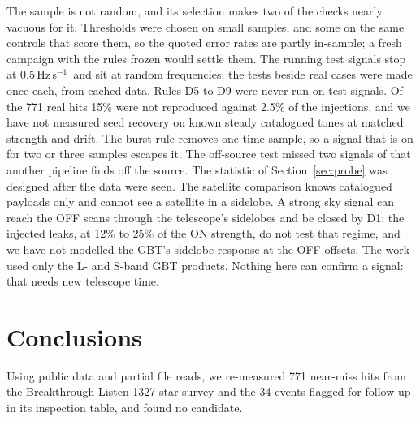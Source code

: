 \documentclass[twocolumn]{aastex631}
\newcommand{\hzs}{Hz\,s$^{-1}$}
\begin{document}
The sample is not random, and its selection makes two of the checks nearly
vacuous for it. Thresholds were chosen on small samples, and some on the
same controls that score them, so the quoted error rates are partly
in-sample; a fresh campaign with the rules frozen would settle them. The
running test signals stop at 0.5\,\hzs\ and sit at random frequencies; the
tests beside real cases were made once each, from cached data. Rules D5 to
D9 were never run on test signals. Of the 771 real hits 15\% were not
reproduced against 2.5\% of the injections, and we have not measured seed
recovery on known steady catalogued tones at matched strength and drift. The burst rule removes one time sample, so a signal that is
on for two or three samples escapes it. The off-source test
missed two signals of \citet{Ma2023} that another pipeline finds off the
source. The statistic of Section~\ref{sec:probe} was designed after the
data were seen. The satellite comparison knows catalogued payloads only and
cannot see a satellite in a sidelobe. A strong sky signal can reach the
OFF scans through the telescope's sidelobes and be closed by D1; the
injected leaks, at 12\% to 25\% of the ON strength, do not test that
regime, and we have not modelled the GBT's sidelobe response at the OFF
offsets. The work used only the L- and S-band
GBT products. Nothing here can confirm a signal: that needs new telescope
time.

\section{Conclusions} \label{sec:conclusions}

Using public data and partial file reads, we re-measured 771 near-miss hits
from the Breakthrough Listen 1327-star survey and the 34 events flagged for
follow-up in its inspection table, and found no candidate.
\end{document}
